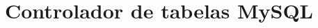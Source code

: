 \documentclass[11pt, brazil]{report}
\begin{document}
%
%
%
%
%
%
%
%
%
%
%
%
%


\section{Controlador de tabelas MySQL}
\end{document}
